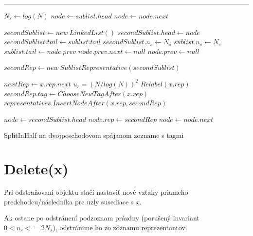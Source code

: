 \documentclass[
  digital,     %
  oneside,     %
  nosansbold,  %
  nocolorbold, %
  lof,         %
  lot,         %
]{fithesis4}
\begin{document}
\begin{algorithm}
\hrule\vspace{0.2em}
$N_s \leftarrow log(N)$\;
$node \leftarrow sublist.head$\;
{
    $node \leftarrow node.next$\;
}

\vspace{10pt}

$secondSublist \leftarrow new~LinkedList()$\;
$secondSublist.head \leftarrow node$\;
$secondSublist.tail \leftarrow sublist.tail$\;
$secondSublist.n_s \leftarrow N_s$\;
$sublist.n_s \leftarrow N_s$\;
$sublist.tail \leftarrow node.prev$\;
$node.prev.next \leftarrow null$\;
$node.prev \leftarrow null$

\vspace{10pt}

$secondRep \leftarrow new~SublistRepresentative(secondSublist)$\;

$nextRep \leftarrow x.rep.next$\;
$u_r = (N/log(N))^2$\;
{
    $Relabel(x.rep)$\;
}
$secondRep.tag \leftarrow ChooseNewTagAfter(x.rep)$\;
$representatives.InsertNodeAfter(x.rep, secondRep)$\;

\vspace{10pt}

$node \leftarrow secondSublist.head$\;
{
    $node.rep \leftarrow secondRep$\;
    $node \leftarrow node.next$\;
}

\caption{SplitInHalf na dvojposchodovom spájanom zozname s tagmi}
\end{algorithm}


\section{Delete(x)}

Pri odstraňovaní objektu stačí nastaviť nové vzťahy priameho predchodcu/následníka pre uzly susediace s $x$.

Ak ostane po odstránení podzoznam prázdny (porušený invariant $0 < n_s <= 2N_s $), odstránime ho zo zoznamu reprezentantov.
\end{document}
